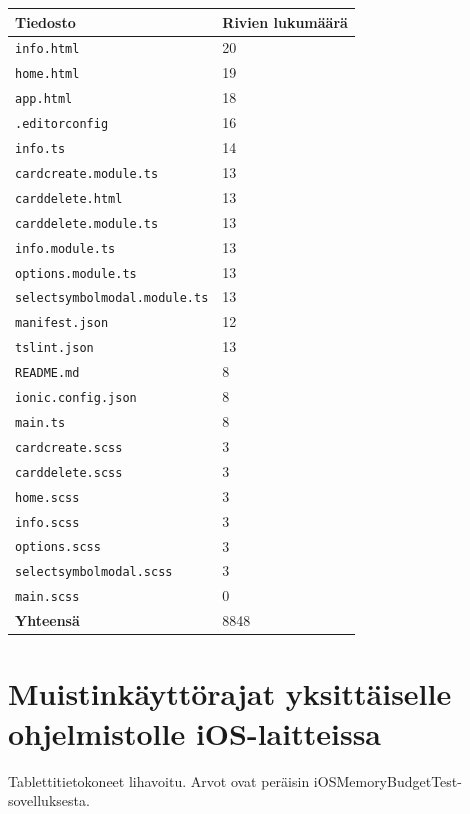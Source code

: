 \documentclass[utf8]{gradu3}
\begin{document}
\begin{center}
    \begin{tabular}{ | l | l |}
    \hline
    \textbf{Tiedosto} & \textbf{Rivien lukumäärä} \\ \hline
    \texttt{info.html} & 20 \\ \hline
    \texttt{home.html} & 19 \\ \hline
    \texttt{app.html} & 18 \\ \hline
    \texttt{.editorconfig} & 16 \\ \hline
    \texttt{info.ts} & 14 \\ \hline
    \texttt{cardcreate.module.ts} & 13 \\ \hline
    \texttt{carddelete.html} & 13 \\ \hline
    \texttt{carddelete.module.ts} & 13 \\ \hline
    \texttt{info.module.ts} & 13 \\ \hline
    \texttt{options.module.ts} & 13 \\ \hline
    \texttt{selectsymbolmodal.module.ts} & 13 \\ \hline
    \texttt{manifest.json} & 12 \\ \hline
    \texttt{tslint.json} & 13 \\ \hline
    \texttt{README.md} & 8 \\ \hline
    \texttt{ionic.config.json} & 8 \\ \hline
    \texttt{main.ts} & 8 \\ \hline
    \texttt{cardcreate.scss} & 3 \\ \hline
    \texttt{carddelete.scss} & 3 \\ \hline
    \texttt{home.scss} & 3 \\ \hline
    \texttt{info.scss} & 3 \\ \hline
    \texttt{options.scss} & 3 \\ \hline
    \texttt{selectsymbolmodal.scss} & 3 \\ \hline
    \texttt{main.scss} & 0 \\ \hline
    \textbf{Yhteensä} & 8848 \\
    \hline
    \end{tabular}
\end{center}

\newpage
\section{Muistinkäyttörajat yksittäiselle ohjelmistolle iOS-laitteissa}
Tablettitietokoneet lihavoitu. Arvot ovat peräisin iOSMemoryBudgetTest-sovelluksesta. \parencite[]{ios-memory-use}
\end{document}
